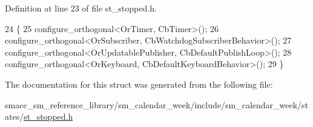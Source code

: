 Definition at line 23 of file st\+\_\+stopped.\+h.


\begin{DoxyCode}
24     \{
25         configure\_orthogonal<OrTimer, CbTimer>();   
26         configure\_orthogonal<OrSubscriber, CbWatchdogSubscriberBehavior>();
27         configure\_orthogonal<OrUpdatablePublisher, CbDefaultPublishLoop>();
28         configure\_orthogonal<OrKeyboard, CbDefaultKeyboardBehavior>();
29     \}
\end{DoxyCode}


The documentation for this struct was generated from the following file\+:\begin{DoxyCompactItemize}
\item 
smacc\+\_\+sm\+\_\+reference\+\_\+library/sm\+\_\+calendar\+\_\+week/include/sm\+\_\+calendar\+\_\+week/states/\hyperlink{sm__calendar__week_2include_2sm__calendar__week_2states_2st__stopped_8h}{st\+\_\+stopped.\+h}\end{DoxyCompactItemize}
